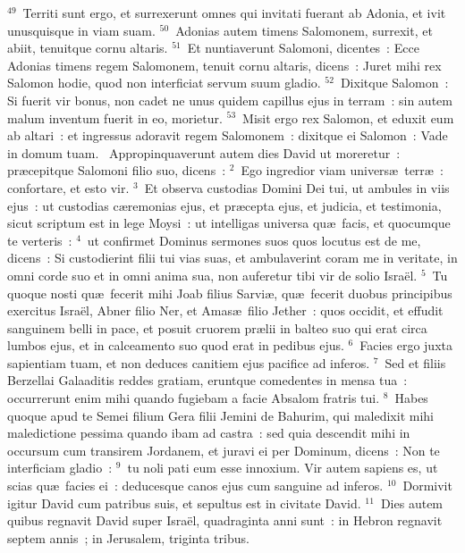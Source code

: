 ${}^{49}$~Territi sunt ergo, et surrexerunt omnes qui invitati fuerant ab Adonia, et ivit unusquisque in viam suam.
${}^{50}$~Adonias autem timens Salomonem, surrexit, et abiit, tenuitque cornu altaris.
${}^{51}$~Et nuntiaverunt Salomoni, dicentes~: Ecce Adonias timens regem Salomonem, tenuit cornu altaris, dicens~: Juret mihi rex Salomon hodie, quod non interficiat servum suum gladio.
${}^{52}$~Dixitque Salomon~: Si fuerit vir bonus, non cadet ne unus quidem capillus ejus in terram~: sin autem malum inventum fuerit in eo, morietur.
${}^{53}$~Misit ergo rex Salomon, et eduxit eum ab altari~: et ingressus adoravit regem Salomonem~: dixitque ei Salomon~: Vade in domum tuam.
~\lettrine[lines=10,image=true,loversize=0.05,lraise=-0.03]{A}{}ppropinquaverunt autem dies David ut moreretur~: pr\ae cepitque Salomoni filio suo, dicens~:
${}^{2}$~Ego ingredior viam univers\ae\ terr\ae~: confortare, et esto vir.
${}^{3}$~Et observa custodias Domini Dei tui, ut ambules in viis ejus~: ut custodias c\ae remonias ejus, et pr\ae cepta ejus, et judicia, et testimonia, sicut scriptum est in lege Moysi~: ut intelligas universa qu\ae\ facis, et quocumque te verteris~:
${}^{4}$~ut confirmet Dominus sermones suos quos locutus est de me, dicens~: Si custodierint filii tui vias suas, et ambulaverint coram me in veritate, in omni corde suo et in omni anima sua, non auferetur tibi vir de solio Isra\"el.
${}^{5}$~Tu quoque nosti qu\ae\ fecerit mihi Joab filius Sarvi\ae , qu\ae\ fecerit duobus principibus exercitus Isra\"el, Abner filio Ner, et Amas\ae\ filio Jether~: quos occidit, et effudit sanguinem belli in pace, et posuit cruorem pr\ae lii in balteo suo qui erat circa lumbos ejus, et in calceamento suo quod erat in pedibus ejus.
${}^{6}$~Facies ergo juxta sapientiam tuam, et non deduces canitiem ejus pacifice ad inferos.
${}^{7}$~Sed et filiis Berzellai Galaaditis reddes gratiam, eruntque comedentes in mensa tua~: occurrerunt enim mihi quando fugiebam a facie Absalom fratris tui.
${}^{8}$~Habes quoque apud te Semei filium Gera filii Jemini de Bahurim, qui maledixit mihi maledictione pessima quando ibam ad castra~: sed quia descendit mihi in occursum cum transirem Jordanem, et juravi ei per Dominum, dicens~: Non te interficiam gladio~:
${}^{9}$~tu noli pati eum esse innoxium. Vir autem sapiens es, ut scias qu\ae\ facies ei~: deducesque canos ejus cum sanguine ad inferos.
${}^{10}$~Dormivit igitur David cum patribus suis, et sepultus est in civitate David.
${}^{11}$~Dies autem quibus regnavit David super Isra\"el, quadraginta anni sunt~: in Hebron regnavit septem annis~; in Jerusalem, triginta tribus.


